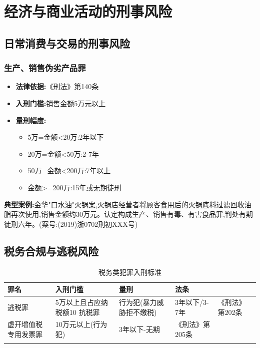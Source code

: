 \documentclass[12pt,a4paper]{article}
\begin{document}
\clearpage

\section{经济与商业活动的刑事风险}

\subsection{日常消费与交易的刑事风险}

\subsubsection{生产、销售伪劣产品罪}
\begin{itemize}
  \item \textbf{法律依据:}《刑法》第140条
  \item \textbf{入刑门槛:}销售金额5万元以上
  \item \textbf{量刑幅度:}
    \begin{itemize}
      \item 5万=金额<20万:2年以下
      \item 20万=金额<50万:2-7年
      \item 50万=金额<200万:7年以上
      \item 金额>=200万:15年或无期徒刑
    \end{itemize}
\end{itemize}

\textbf{典型案例:}金华"口水油"火锅案,火锅店经营者将顾客食用后的火锅底料过滤回收油脂再次使用,销售金额约30万元。认定构成生产、销售有毒、有害食品罪,判处有期徒刑六年。(案号:(2019)浙0702刑初XXX号)

\subsection{税务合规与逃税风险}

\begin{longtable}{p{3cm}p{5cm}p{3cm}p{2cm}}
  \toprule
  \textbf{罪名} & \textbf{入刑门槛} & \textbf{量刑} & \textbf{法条} \\
  \midrule
  逃税罪 & 5万以上且占应纳税额10%
  抗税罪 & 行为犯(暴力威胁拒不缴税) & 3年以下/3-7年 & 《刑法》第202条 \\
  虚开增值税专用发票罪 & 10万元以上(行为犯) & 3年以下-无期 & 《刑法》第205条 \\
  \bottomrule
  \caption{税务类犯罪入刑标准}
\end{longtable}
\end{document}
